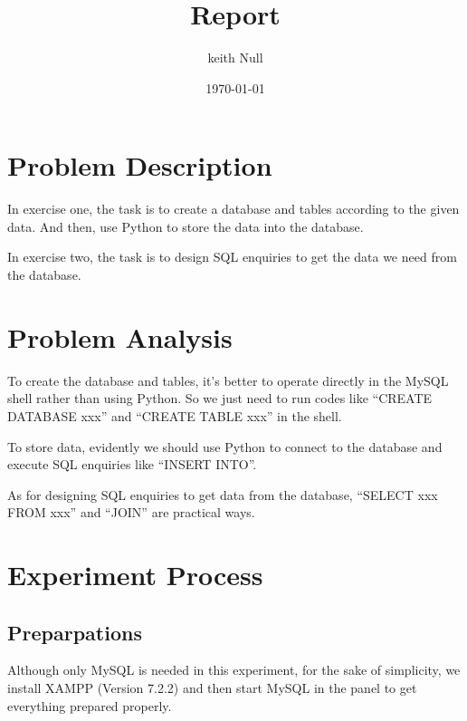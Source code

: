 \documentclass{article}
\author{keith Null}
\title{Report}
\date{\today}
\begin{document}
    \maketitle
    \section{Problem Description}
In  exercise  one,  the  task  is  to  create  a  database  and  tables
according to the given data. And then, use Python to store the data
into the database.

In exercise two, the task is to design SQL enquiries to get the
data we need from the database.

    \section{Problem Analysis}
To create the database and tables, it’s better to operate directly
in the MySQL shell rather than using Python. So we just need to run
codes  like  “CREATE  DATABASE  xxx”  and  “CREATE  TABLE  xxx”  in  the
shell.

To store data, evidently we should use Python to connect to the
database and execute SQL enquiries like “INSERT INTO”.

As  for  designing  SQL  enquiries  to  get  data  from  the  database,
“SELECT xxx FROM xxx” and “JOIN” are practical ways.

    \section{Experiment Process}
        \subsection{Preparpations}
Although only MySQL is needed in this experiment, for the sake of
simplicity, we install XAMPP (Version 7.2.2) and then start MySQL in
the panel to get everything prepared properly.
\end{document}
